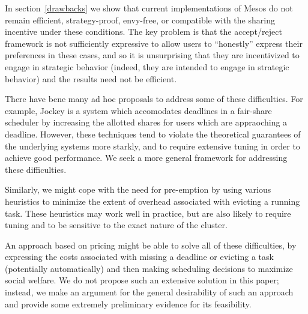 \documentclass{acm_proc_article-sp}
\begin{document}
In section~\ref{drawbacks} we show that current implementations
of Mesos do not remain efficient, strategy-proof, envy-free,
or compatible with the sharing incentive under these conditions.
The key problem is that the accept/reject framework is not sufficiently expressive
to allow users to ``honestly'' express their preferences in these cases,
and so it is unsurprising that they are incentivized to engage
in strategic behavior (indeed, they are intended to engage in strategic behavior)
and the results need not be efficient.

There have bene many ad hoc proposals to address some of these difficulties.
For example, Jockey is a system which accomodates deadlines in a fair-share
scheduler by increasing the allotted shares for users which are appraoching
a deadline.
However, these techniques tend to violate the theoretical guarantees
of the underlying systems more starkly, and to require extensive tuning
in order to achieve good performance.
We seek a more general framework for addressing these difficulties.

Similarly, we might cope with the need for pre-emption by using various
heuristics to minimize the extent of overhead associated with evicting a running
task.
These heuristics may work well in practice, but are also likely to require
tuning and to be sensitive to the exact nature of the cluster.

An approach based on pricing might be able to solve all of these difficulties,
by expressing the costs associated with missing a deadline or evicting a task 
(potentially automatically) and then making scheduling decisions to maximize
social welfare.
We do not propose such an extensive solution in this paper; instead,
we make an argument for the general desirability of such an approach and provide
some extremely preliminary evidence for its feasibility.
\end{document}
